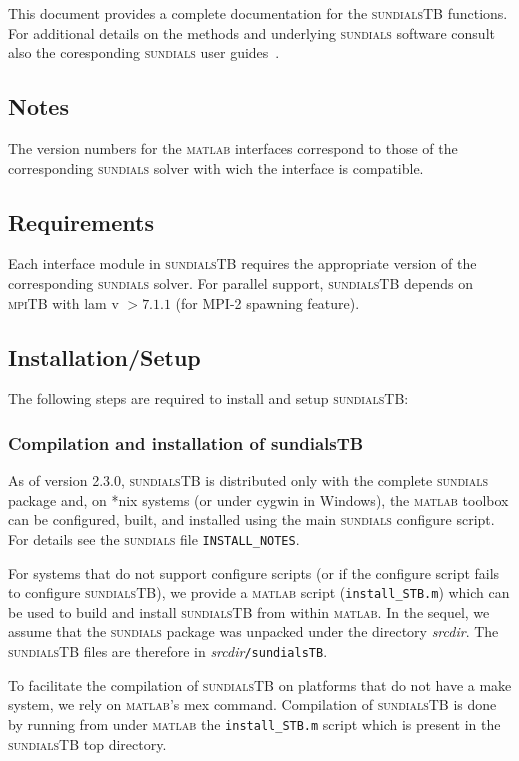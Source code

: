 \documentclass[titlepage,10pt]{article}
\newcommand{\sundialsTB}{{\normalfont\scshape sundialsTB}}
\newcommand{\sundials}{{\normalfont\scshape sundials}}
\newcommand{\matlab}{{\normalfont\scshape matlab}}
\newcommand{\mpiTB}{{\normalfont\scshape mpiTB}}
\begin{document}
This document provides a complete documentation for the {\sundialsTB} functions.
For additional details on the methods and underlying {\sundials} software consult
also the coresponding {\sundials} user guides~\cite{cvodes_ug,kinsol_ug}.

\subsection{Notes}

The version numbers for the {\matlab} interfaces correspond to those of the 
corresponding {\sundials} solver with wich the interface is compatible.

\subsection{Requirements}

Each interface module in {\sundialsTB} requires the appropriate version of the 
corresponding {\sundials} solver. For parallel support, {\sundialsTB} depends on
{\mpiTB} with {\sc lam} v $> 7.1.1$ (for MPI-2 spawning feature).

\subsection{Installation/Setup} 

The following steps are required to install and setup {\sundialsTB}:

\subsubsection{Compilation and installation of sundialsTB}

As of version 2.3.0, {\sundialsTB} is distributed only with the complete {\sundials} package
and, on *nix systems (or under cygwin in Windows), the {\matlab} toolbox can be configured,
built, and installed using the main {\sundials} configure script. For details see the
{\sundials} file {\tt INSTALL\_NOTES}. 

For systems that do not support configure scripts (or if the configure script fails to
configure {\sundialsTB}), we provide a {\matlab} script ({\tt install\_STB.m}) which can be used
to build and install {\sundialsTB} from within {\matlab}. In the sequel, we assume that the 
{\sundials} package was unpacked under the directory {\em srcdir}. The {\sundialsTB} files are 
therefore in {\em srcdir}{\tt /sundialsTB}. 

To facilitate the compilation of {\sundialsTB} on platforms that do not have
a make system, we rely on {\matlab}'s mex command. Compilation of {\sundialsTB}
is done by running from under {\matlab} the {\tt install\_STB.m} script which is
present in the {\sundialsTB} top directory.
\end{document}
